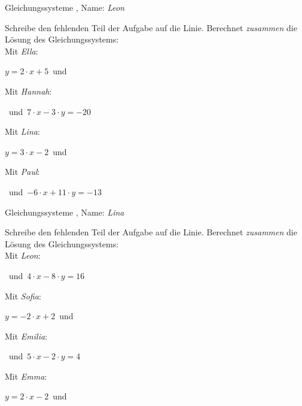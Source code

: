 \newpage
\begin{center}\large Gleichungssysteme
, Name: \emph{Leon}\end{center}
Schreibe den fehlenden Teil der Aufgabe auf die Linie. Berechnet \emph{zusammen} die Lösung des Gleichungssystems:
\\
\vfill Mit \emph{Ella}:
\begin{center}$y=2\cdot x+5$\mbox{ }und\mbox{ }\underline{}
\end{center}
\vfill Mit \emph{Hannah}:
\begin{center}\underline{}
\mbox{ }und\mbox{ }$7\cdot x-3\cdot y=-20$\end{center}
\vfill Mit \emph{Lina}:
\begin{center}$y=3\cdot x-2$\mbox{ }und\mbox{ }\underline{}
\end{center}
\vfill Mit \emph{Paul}:
\begin{center}\underline{}
\mbox{ }und\mbox{ }$-6\cdot x+11\cdot y=-13$\end{center}
\newpage
\begin{center}\large Gleichungssysteme
, Name: \emph{Lina}\end{center}
Schreibe den fehlenden Teil der Aufgabe auf die Linie. Berechnet \emph{zusammen} die Lösung des Gleichungssystems:
\\
\vfill Mit \emph{Leon}:
\begin{center}\underline{}
\mbox{ }und\mbox{ }$4\cdot x-8\cdot y=16$\end{center}
\vfill Mit \emph{Sofia}:
\begin{center}$y=-2\cdot x+2$\mbox{ }und\mbox{ }\underline{}
\end{center}
\vfill Mit \emph{Emilia}:
\begin{center}\underline{}
\mbox{ }und\mbox{ }$5\cdot x-2\cdot y=4$\end{center}
\vfill Mit \emph{Emma}:
\begin{center}$y=2\cdot x-2$\mbox{ }und\mbox{ }\underline{}
\end{center}
